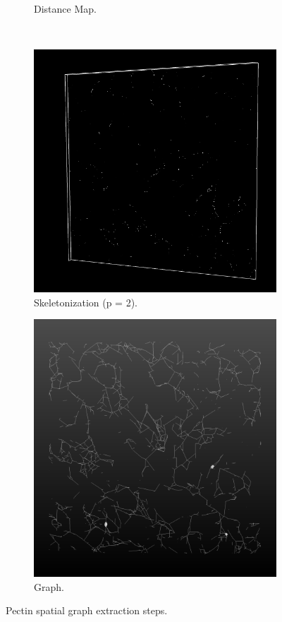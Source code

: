 \begin{figure}[H]
\begin{subfigure}{0.5\textwidth}
    \caption{Distance Map.}
    \label{subfig:pectin_dmap}
  \end{subfigure}\\[1ex]
  \begin{subfigure}{0.5\textwidth}
    \centering
    \includegraphics[width=0.9\linewidth]{Figures/chapter-image/pipeline_screenshots/pectin_skeleton.png}
    \caption{Skeletonization (p = 2).}
    \label{subfig:pectin_skeleton}
  \end{subfigure}%
  \begin{subfigure}{0.5\textwidth}
    \centering
    \includegraphics[width=0.9\linewidth]{Figures/chapter-image/pipeline_screenshots/pectin_graph.png}
    \caption{Graph.}
    \label{fig:pectin_graph}
  \end{subfigure}%
  \caption{Pectin spatial graph extraction steps.}
  \label{fig:pectin_all}
\end{figure}

